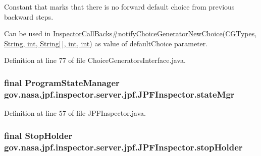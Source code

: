 Constant that marks that there is no forward default choice from previous backward steps. 

Can be used in \hyperlink{}{Inspector\+Call\+Backs\#notify\+Choice\+Generator\+New\+Choice(\+C\+G\+Types, String, int, String\mbox{[}$\,$\mbox{]}, int, int)} as value of default\+Choice parameter. 

Definition at line 77 of file Choice\+Generators\+Interface.\+java.

\subsubsection[{\texorpdfstring{state\+Mgr}{stateMgr}}]{\setlength{\rightskip}{0pt plus 5cm}final {\bf Program\+State\+Manager} gov.\+nasa.\+jpf.\+inspector.\+server.\+jpf.\+J\+P\+F\+Inspector.\+state\+Mgr\hspace{0.3cm}{\ttfamily [protected]}}\hypertarget{classgov_1_1nasa_1_1jpf_1_1inspector_1_1server_1_1jpf_1_1_j_p_f_inspector_ae9f172366498ddc7e73112122f69fc56}{}\label{classgov_1_1nasa_1_1jpf_1_1inspector_1_1server_1_1jpf_1_1_j_p_f_inspector_ae9f172366498ddc7e73112122f69fc56}


Definition at line 57 of file J\+P\+F\+Inspector.\+java.

\subsubsection[{\texorpdfstring{stop\+Holder}{stopHolder}}]{\setlength{\rightskip}{0pt plus 5cm}final {\bf Stop\+Holder} gov.\+nasa.\+jpf.\+inspector.\+server.\+jpf.\+J\+P\+F\+Inspector.\+stop\+Holder\hspace{0.3cm}{\ttfamily [protected]}}\hypertarget{classgov_1_1nasa_1_1jpf_1_1inspector_1_1server_1_1jpf_1_1_j_p_f_inspector_a2923ac1820e368a9fa343fb3f4a14e19}{}\label{classgov_1_1nasa_1_1jpf_1_1inspector_1_1server_1_1jpf_1_1_j_p_f_inspector_a2923ac1820e368a9fa343fb3f4a14e19}


